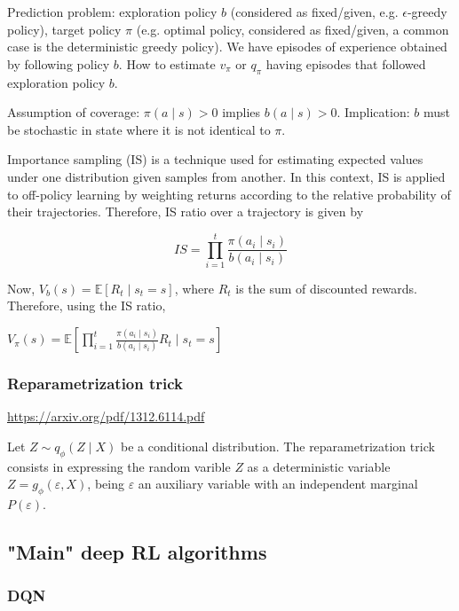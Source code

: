 \documentclass[12pt, english]{article}
\begin{document}
Prediction problem: exploration policy $b$ (considered as fixed/given, e.g. $\epsilon$-greedy policy), target policy $\pi$ (e.g. optimal policy, considered as fixed/given, a common case is the deterministic greedy policy). We have episodes of experience obtained by following policy $b$. How to estimate $v_\pi$ or $q_\pi$ having episodes that followed exploration policy $b$.

Assumption of coverage: $\pi(a \mid s) > 0$ implies $b(a \mid s) > 0$. Implication: $b$ must be stochastic in state where it is not identical to $\pi$.

Importance sampling (IS) is a technique used for estimating expected values under one distribution given samples from another. In this context, IS is applied to off-policy learning by weighting returns according to the relative probability of their trajectories. Therefore, IS ratio over a trajectory is given by

\begin{equation}
  IS = \prod_{i=1}^t \frac{\pi(a_i \mid s_i)}{b(a_i \mid s_i)}
\end{equation}

Now, $V_b (s) = \mathbb{E} [R_t \mid s_t = s]$, where $R_t$ is the sum of discounted rewards. Therefore, using the IS ratio,

$V_\pi (s) = \mathbb{E} [\prod_{i=1}^t \frac{\pi(a_i \mid s_i)}{b(a_i \mid s_i)} R_t \mid s_t = s]$

\subsubsection{Reparametrization trick}

\url{https://arxiv.org/pdf/1312.6114.pdf}

Let $Z \sim q_\phi(Z \mid X)$ be a conditional distribution. The reparametrization trick consists in expressing the random varible $Z$ as a deterministic variable $Z = g_\phi(\varepsilon, X)$, being $\varepsilon$ an auxiliary variable with an independent marginal $P(\varepsilon)$.


\subsection{"Main" deep RL algorithms}

\subsubsection{DQN}
\label{DQN}
\end{document}
